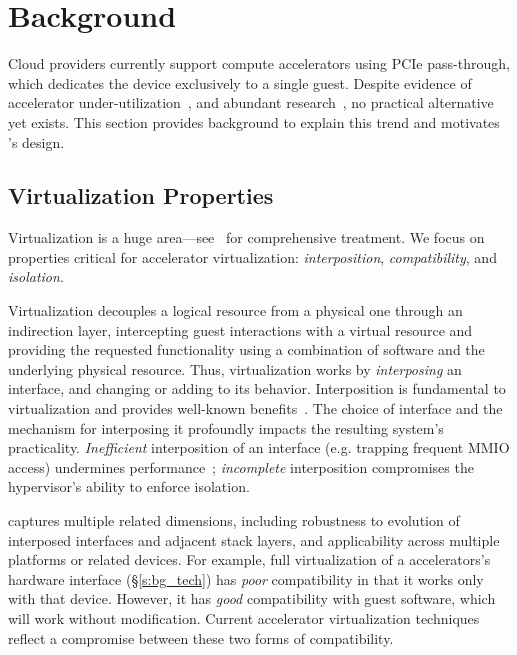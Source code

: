 \section{Background}
\label{s:background}


Cloud providers currently support compute accelerators using PCIe pass-through, which dedicates the device exclusively to a single guest.
Despite evidence of accelerator under-utilization~\cite{underutilizingcloud,simultaneous_multikernel,improving_gpu,gpl,fiddle}, and abundant
research~\cite{simultaneous_multikernel,improving_gpu,gpl,fiddle,zhang2018g,yeh2017pagoda}, no practical alternative yet exists.
This section provides background to explain this trend and motivates \Model's design.

\subsection{Virtualization Properties}
\label{s:properties}

Virtualization is a huge area---see~\cite{bugnion_neih_tsafrir} for comprehensive treatment.
We focus on properties critical for accelerator virtualization: \emph{interposition}, \emph{compatibility}, and \emph{isolation}.

Virtualization decouples a logical resource from a physical one
through an indirection layer, intercepting guest interactions with
a virtual resource and providing the requested functionality using
a combination of software and the underlying physical resource.
Thus, virtualization works by \emph{interposing}
an interface, and changing or adding to its behavior.
Interposition is fundamental to virtualization and provides well-known benefits~\cite{waldspurger-iovirt}.
The choice of interface and the mechanism for interposing it
profoundly impacts the resulting system's practicality.
\emph{Inefficient} interposition of an interface (e.g. trapping frequent MMIO access) undermines
performance~\cite{suzuki2014gpuvm,yufull}; \emph{incomplete} interposition
compromises the hypervisor's ability to enforce isolation.

 captures multiple related dimensions, including
robustness to evolution of interposed interfaces and adjacent stack layers,
and applicability across multiple platforms or related devices.
For example, full virtualization of a accelerators's hardware interface (\S\ref{s:bg_tech})
has \emph{poor} compatibility in that it works only with that device.
However, it has \emph{good} compatibility with guest software,
which will work without modification.
Current accelerator virtualization techniques
reflect a compromise between these two forms of compatibility.


